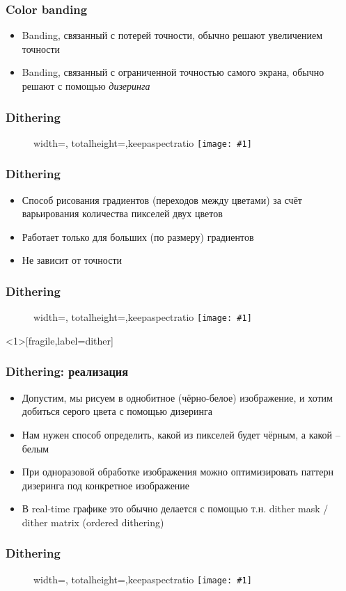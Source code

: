 \documentclass{beamer}
\newcommand{\slideimage}[1]{
  \begin{figure}
    \begin{adjustbox}{width=\textwidth, totalheight=\textheight-2\baselineskip-2\baselineskip,keepaspectratio}
      \texttt{[image: \#1]}
    \end{adjustbox}
  \end{figure}
}
\begin{document}
\begin{frame}[fragile]
\frametitle{Color banding}
\begin{itemize}
\item Banding, связанный с потерей точности, обычно решают увеличением точности
\pause
\item Banding, связанный с ограниченной точностью самого экрана, обычно решают с помощью \textit{дизеринга}
\end{itemize}
\end{frame}

\begin{frame}[fragile]
\frametitle{Dithering}
\slideimage{dither.png}
\end{frame}

\begin{frame}[fragile]
\frametitle{Dithering}
\begin{itemize}
\item Способ рисования градиентов (переходов между цветами) за счёт варьирования количества пикселей двух цветов
\pause
\item Работает только для больших (по размеру) градиентов
\pause
\item Не зависит от точности
\end{itemize}
\end{frame}

\begin{frame}[fragile]
\frametitle{Dithering}
\slideimage{dither2.png}
\end{frame}

\begin{frame}<1>[fragile,label=dither]
\frametitle{Dithering: реализация}
\begin{itemize}
\item Допустим, мы рисуем в однобитное (чёрно-белое) изображение, и хотим добиться серого цвета с помощью дизеринга
\pause
\item Нам нужен способ определить, какой из пикселей будет чёрным, а какой -- белым
\pause
\item При одноразовой обработке изображения можно оптимизировать паттерн дизеринга под конкретное изображение
\pause
\item В real-time графике это обычно делается с помощью т.н. dither mask / dither matrix (ordered dithering)
\end{itemize}
\end{frame}

\begin{frame}[fragile]
\frametitle{Dithering}
\slideimage{dither3.png}
\end{frame}
\end{document}
